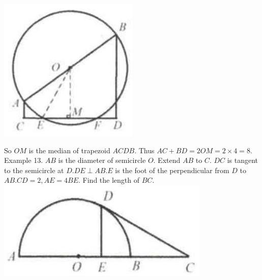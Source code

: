 \documentclass[10pt]{article}
\begin{document}
\includegraphics[max width=\textwidth, center]{2025_04_17_97bc1f7e44d93c271a88g-152(2)}

So \(O M\) is the median of trapezoid \(A C D B\). Thus \(A C+B D=2 O M=2 \times 4=8\).\\
Example 13. \(A B\) is the diameter of semicircle \(O\). Extend \(A B\) to \(C\). \(D C\) is tangent to the semicircle at \(D . D E \perp A B . E\) is the foot of the perpendicular from \(D\) to \(A B . C D=2, A E=4 B E\). Find the length of \(B C\).\\
\includegraphics[max width=\textwidth, center]{2025_04_17_97bc1f7e44d93c271a88g-152}
\end{document}
